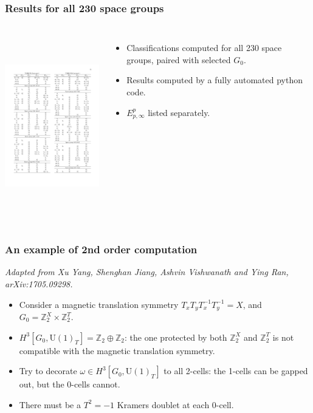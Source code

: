 \documentclass[xcolor=table, 11pt, aspectratio=169]{beamer}
\newcommand{\uone}{\mathrm U(1)}
\begin{document}
\begin{frame}
	\frametitle{Results for all 230 space groups}
	\begin{columns}
		\includegraphics[height=8cm]{bigtable}
		\begin{itemize}
			\item Classifications computed for all 230 space groups, paired with selected $G_0$.
			\item Results computed by a fully automated python code.
			\item $E^p_{p,\infty}$ listed separately.
		\end{itemize}
	\end{columns}
\end{frame}

\begin{frame}
\frametitle{An example of 2nd order computation}
\emph{\small Adapted from Xu Yang, Shenghan Jiang, Ashvin Vishwanath and Ying Ran, arXiv:1705.09298.}
\begin{itemize}
	\item Consider a magnetic translation symmetry $T_xT_yT_x^{-1}T_y^{-1} = X$, and $G_0=\mathbb Z_2^X\times\mathbb Z_2^T$.
	\item $H^3[G_0,\uone_T]=\mathbb Z_2\oplus\mathbb Z_2$: the one protected by both $\mathbb Z_2^X$ and $\mathbb Z_2^T$ is \alert{not compatible} with the magnetic translation symmetry.
	\item Try to decorate $\omega\in H^3[G_0,\uone_T]$ to all 2-cells: the 1-cells can be gapped out, but the 0-cells \alert{cannot}.
	\item There must be a $T^2=-1$ Kramers doublet at each 0-cell.
\end{itemize}
\begin{center}
\end{center}
\end{frame}
\end{document}

